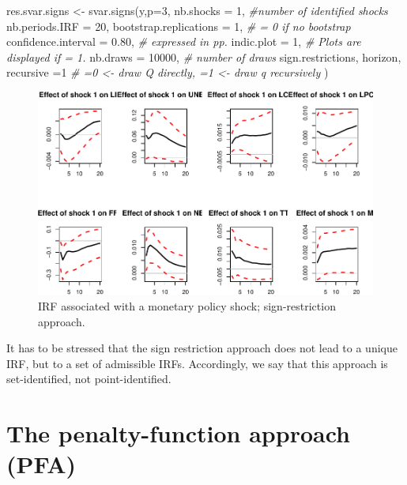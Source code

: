 \documentclass[
  12pt,
]{book}
\newenvironment{Shaded}{\begin{snugshade}}{\end{snugshade}}
\newcommand{\AttributeTok}[1]{\textcolor[rgb]{0.77,0.63,0.00}{#1}}
\newcommand{\CommentTok}[1]{\textcolor[rgb]{0.56,0.35,0.01}{\textit{#1}}}
\newcommand{\DecValTok}[1]{\textcolor[rgb]{0.00,0.00,0.81}{#1}}
\newcommand{\FloatTok}[1]{\textcolor[rgb]{0.00,0.00,0.81}{#1}}
\newcommand{\FunctionTok}[1]{\textcolor[rgb]{0.00,0.00,0.00}{#1}}
\newcommand{\NormalTok}[1]{#1}
\newcommand{\OtherTok}[1]{\textcolor[rgb]{0.56,0.35,0.01}{#1}}
\theoremstyle{definition}
\theoremstyle{definition}
\theoremstyle{definition}
\theoremstyle{definition}
\theoremstyle{remark}
\begin{document}
\begin{Shaded}
\begin{Highlighting}[]
\NormalTok{res.svar.signs }\OtherTok{\textless{}{-}} 
  \FunctionTok{svar.signs}\NormalTok{(y,}\AttributeTok{p=}\DecValTok{3}\NormalTok{,}
             \AttributeTok{nb.shocks =} \DecValTok{1}\NormalTok{, }\CommentTok{\#number of identified shocks}
             \AttributeTok{nb.periods.IRF =} \DecValTok{20}\NormalTok{,}
             \AttributeTok{bootstrap.replications =} \DecValTok{1}\NormalTok{, }\CommentTok{\# = 0 if no bootstrap}
             \AttributeTok{confidence.interval =} \FloatTok{0.80}\NormalTok{, }\CommentTok{\# expressed in pp.}
             \AttributeTok{indic.plot =} \DecValTok{1}\NormalTok{, }\CommentTok{\# Plots are displayed if = 1.}
             \AttributeTok{nb.draws =} \DecValTok{10000}\NormalTok{, }\CommentTok{\# number of draws}
\NormalTok{             sign.restrictions,}
\NormalTok{             horizon,}
             \AttributeTok{recursive =}\DecValTok{1} \CommentTok{\#  =0 \textless{}{-} draw Q directly, =1 \textless{}{-} draw q recursively}
\NormalTok{  )}
\end{Highlighting}
\end{Shaded}

\begin{figure}
\includegraphics[width=0.95\linewidth]{IdentifStructShocks_files/figure-latex/signrestr1-1} \caption{IRF associated with a monetary policy shock; sign-restriction approach.}\label{fig:signrestr1}
\end{figure}

It has to be stressed that the sign restriction approach does not lead to a unique IRF, but to a set of admissible IRFs. Accordingly, we say that this approach is set-identified, not point-identified.

\hypertarget{the-penalty-function-approach-pfa}{%
\section{The penalty-function approach (PFA)}\label{the-penalty-function-approach-pfa}}
\end{document}

